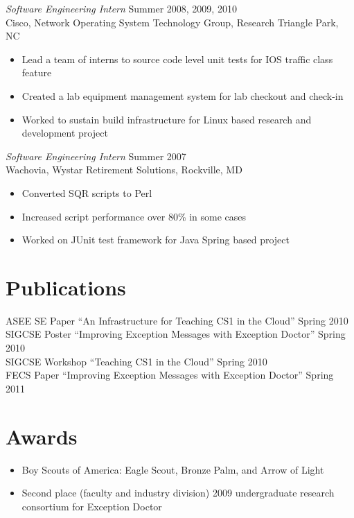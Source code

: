 \documentclass[line,margin]{res}
\begin{document}
\begin{resume}
        {\sl Software Engineering Intern} \hfill  Summer 2008, 2009, 2010 \\
           Cisco, Network Operating System Technology Group, Research Triangle Park, NC
              \begin{itemize}  \itemsep -2pt %
                   \item Lead a team of interns to source code level unit
                     tests for IOS traffic class feature
                   \item Created a lab equipment management system for lab checkout and check-in
                   \item Worked to sustain build infrastructure for Linux
                     based research and development project
              \end{itemize}
        {\sl Software Engineering Intern} \hfill  Summer 2007 \\
           Wachovia, Wystar Retirement Solutions, Rockville, MD
              \begin{itemize}  \itemsep -2pt %
                   \item Converted SQR scripts to Perl
                   \item Increased script performance over 80\% in some cases
                   \item Worked on JUnit test framework for Java Spring based project
              \end{itemize} 

\section{Publications}
ASEE SE Paper ``An Infrastructure for Teaching CS1 in the Cloud'' Spring 2010 \\
SIGCSE Poster ``Improving Exception Messages with Exception Doctor'' Spring 2010 \\
SIGCSE Workshop ``Teaching CS1 in the Cloud'' Spring 2010 \\
FECS Paper ``Improving Exception Messages with Exception Doctor'' Spring 2011

\section{Awards}
\begin{itemize}  \itemsep -2pt %
\item Boy Scouts of America: Eagle Scout, Bronze Palm, and Arrow of Light
\item Second place (faculty and industry division) 2009 undergraduate research consortium for Exception Doctor
\end{itemize}
\end{resume}
\end{document}
